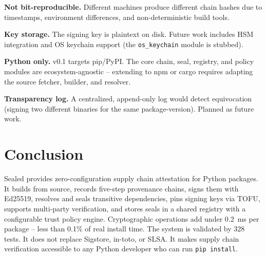 \documentclass[11pt,a4paper]{article}
\begin{document}
\textbf{Not bit-reproducible.} Different machines produce different chain hashes due to timestamps, environment differences, and non-deterministic build tools.

\textbf{Key storage.} The signing key is plaintext on disk. Future work includes HSM integration and OS keychain support (the \texttt{os\_keychain} module is stubbed).

\textbf{Python only.} v0.1 targets pip/PyPI. The core chain, seal, registry, and policy modules are ecosystem-agnostic -- extending to npm or cargo requires adapting the source fetcher, builder, and resolver.

\textbf{Transparency log.} A centralized, append-only log would detect equivocation (signing two different binaries for the same package-version). Planned as future work.

\section{Conclusion}

Sealed provides zero-configuration supply chain attestation for Python packages. It builds from source, records five-step provenance chains, signs them with Ed25519, resolves and seals transitive dependencies, pins signing keys via TOFU, supports multi-party verification, and stores seals in a shared registry with a configurable trust policy engine. Cryptographic operations add under 0.2~ms per package -- less than 0.1\% of real install time. The system is validated by 328 tests. It does not replace Sigstore, in-toto, or SLSA. It makes supply chain verification accessible to any Python developer who can run \texttt{pip install}.
\end{document}
